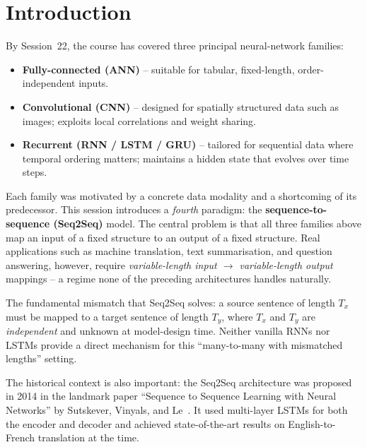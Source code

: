 \documentclass[12pt,a4paper]{article}
\begin{document}
\newpage

\section{Introduction}
\label{sec:introduction}

By Session~22, the course has covered three principal neural-network families:
\begin{itemize}[noitemsep]
  \item \textbf{Fully-connected (ANN)} -- suitable for tabular, fixed-length, order-independent inputs.
  \item \textbf{Convolutional (CNN)} -- designed for spatially structured data such as images; exploits
        local correlations and weight sharing.
  \item \textbf{Recurrent (RNN / LSTM / GRU)} -- tailored for sequential data where temporal ordering
        matters; maintains a hidden state that evolves over time steps.
\end{itemize}

Each family was motivated by a concrete data modality and a shortcoming of its predecessor. This
session introduces a \emph{fourth} paradigm: the \textbf{sequence-to-sequence (Seq2Seq)} model. The
central problem is that all three families above map an input of a fixed structure to an output of a
fixed structure. Real applications such as machine translation, text summarisation, and question
answering, however, require \emph{variable-length input $\to$ variable-length output} mappings -- a
regime none of the preceding architectures handles naturally.

\begin{keyinsight}
  The fundamental mismatch that Seq2Seq solves: a source sentence of length $T_x$ must be
  mapped to a target sentence of length $T_y$, where $T_x$ and $T_y$ are \emph{independent}
  and unknown at model-design time. Neither vanilla RNNs nor LSTMs provide a direct mechanism
  for this ``many-to-many with mismatched lengths'' setting.
\end{keyinsight}

The historical context is also important: the Seq2Seq architecture was proposed in 2014 in the
landmark paper ``Sequence to Sequence Learning with Neural Networks'' by Sutskever, Vinyals, and
Le~\cite{sutskever2014}. It used multi-layer LSTMs for both the encoder and decoder and achieved
state-of-the-art results on English-to-French translation at the time.
\end{document}
